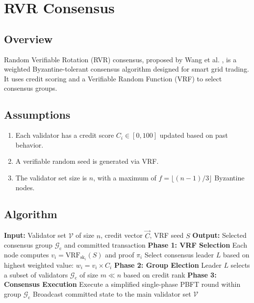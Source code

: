 \documentclass[12pt, oneside, a4paper]{report}
\theoremstyle{definition}
\theoremstyle{remark}
\begin{document}
\bigskip

\section{RVR Consensus}
\label{sec:cm:rvr}

\subsection{Overview}
Random Verifiable Rotation (RVR) consensus, proposed by Wang et al. \cite{wang2025}, is a weighted Byzantine-tolerant consensus algorithm designed for smart grid trading. It uses credit scoring and a Verifiable Random Function (VRF) to select consensus groups.

\subsection{Assumptions}
\begin{enumerate}
  \item Each validator has a credit score $C_i \in [0, 100]$ updated based on past behavior.
  \item A verifiable random seed is generated via VRF.
  \item The validator set size is $n$, with a maximum of $f = \lfloor (n-1)/3 \rfloor$ Byzantine nodes.
\end{enumerate}

\subsection{Algorithm}
\begin{algorithm}[H]
\caption{RVR Leader Selection and Consensus}
\label{alg:rvr}
\begin{algorithmic}[1]
\STATE \textbf{Input:} Validator set $\mathcal{V}$ of size $n$, credit vector $\vec{C}$, VRF seed $S$
\STATE \textbf{Output:} Selected consensus group $\mathcal{G}_{\mathrm{c}}$ and committed transaction
\STATE \textbf{Phase 1: VRF Selection}
\STATE Each node computes $v_i = \mathrm{VRF}_{\mathrm{sk}_i}(S)$ and proof $\pi_i$
\STATE Select consensus leader $L$ based on highest weighted value: $w_i = v_i \times C_i$
\STATE \textbf{Phase 2: Group Election}
\STATE Leader $L$ selects a subset of validators $\mathcal{G}_{\mathrm{c}}$ of size $m \ll n$ based on credit rank
\STATE \textbf{Phase 3: Consensus Execution}
\STATE Execute a simplified single-phase PBFT round within group $\mathcal{G}_{\mathrm{c}}$
\STATE Broadcast committed state to the main validator set $\mathcal{V}$
\end{algorithmic}
\end{algorithm}
\end{document}
